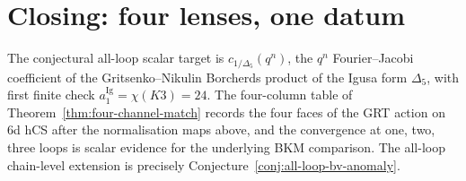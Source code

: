 \section{Closing: four lenses, one datum}

The conjectural all-loop scalar target is
$c_{1/\Delta_5}(q^n)$, the $q^{n}$ Fourier--Jacobi coefficient of the
Gritsenko--Nikulin Borcherds product of the Igusa form $\Delta_5$,
with first finite check $a_1^{\mathrm{Ig}}=\chi(K3)=24$.
The four-column table of
Theorem~\ref{thm:four-channel-match} records the four faces of the GRT
action on 6d hCS after the normalisation maps above, and the
convergence at one, two, three loops is scalar evidence for the
underlying BKM comparison. The all-loop chain-level extension is
precisely Conjecture~\ref{conj:all-loop-bv-anomaly}.
